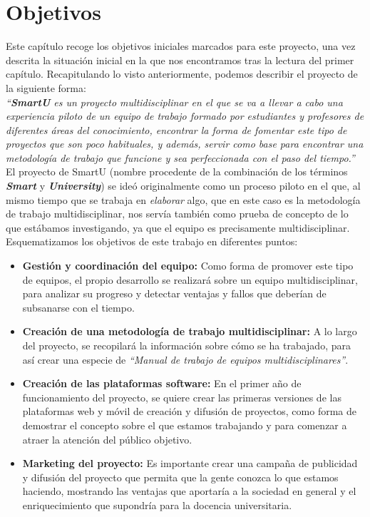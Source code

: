 \chapter{Objetivos}
\label{ch:objetivos}

Este capítulo recoge los objetivos iniciales marcados para este proyecto, una vez descrita la situación inicial en la que nos encontramos tras la lectura del primer capítulo. Recapitulando lo visto anteriormente, podemos describir el proyecto de la siguiente forma:\\

\textit{``\textbf{SmartU} es un proyecto multidisciplinar en el que se va a llevar a cabo una experiencia piloto de un equipo de trabajo formado por estudiantes y profesores de diferentes áreas del conocimiento, encontrar la forma de fomentar este tipo de proyectos que son poco habituales, y además, servir como base para encontrar una metodología de trabajo que funcione y sea perfeccionada con el paso del tiempo.''}\\

El proyecto de SmartU (nombre procedente de la combinación de los términos \textit{\textbf{Smart}} y \textit{\textbf{University}}) se ideó originalmente como un proceso piloto en el que, al mismo tiempo que se trabaja en \textit{elaborar} algo, que en este caso es la metodología de trabajo multidisciplinar, nos servía también como prueba de concepto de lo que estábamos investigando, ya que el equipo es precisamente multidisciplinar.\\

Esquematizamos los objetivos de este trabajo en diferentes puntos:

\begin{itemize}
    \item \textbf{Gestión y coordinación del equipo:} Como forma de promover este tipo de equipos, el propio desarrollo se realizará sobre un equipo multidisciplinar, para analizar su progreso y detectar ventajas y fallos que deberían de subsanarse con el tiempo.
    \item \textbf{Creación de una metodología de trabajo multidisciplinar:} A lo largo del proyecto, se recopilará la información sobre cómo se ha trabajado, para así crear una especie de \textit{``Manual de trabajo de equipos multidisciplinares''}.
    \item \textbf{Creación de las plataformas software:} En el primer año de funcionamiento del proyecto, se quiere crear las primeras versiones de las plataformas web y móvil de creación y difusión de proyectos, como forma de demostrar el concepto sobre el que estamos trabajando y para comenzar a atraer la atención del público objetivo.
    \item \textbf{Marketing del proyecto:} Es importante crear una campaña de publicidad y difusión del proyecto que permita que la gente conozca lo que estamos haciendo, mostrando las ventajas que aportaría a la sociedad en general y el enriquecimiento que supondría para la docencia universitaria.
\end{itemize}

